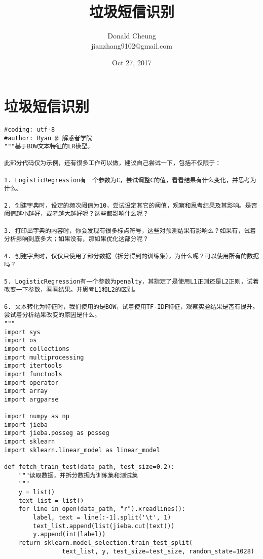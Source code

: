 \documentclass[10pt,a4paper]{ctexbook}
\begin{document}
    \setlength{\baselineskip}{20pt}
    \title{垃圾短信识别}
    \author{Donald Cheung\\jianzhang9102@gmail.com}
    \date{Oct 27, 2017}
    \tableofcontents
\fi

\chapter{垃圾短信识别}

\begin{verbatim}
#coding: utf-8
#author: Ryan @ 解惑者学院
"""基于BOW文本特征的LR模型。

此部分代码仅为示例，还有很多工作可以做，建议自己尝试一下，包括不仅限于：

1. LogisticRegression有一个参数为C，尝试调整C的值，看看结果有什么变化，并思考为什么。

2. 创建字典时，设定的频次阈值为10，尝试设定其它的阈值，观察和思考结果及其影响。是否阈值越小越好，或者越大越好呢？这些都影响什么呢？

3. 打印出字典的内容时，你会发现有很多标点符号，这些对预测结果有影响么？如果有，试着分析影响到底多大；如果没有，那如果优化这部分呢？

4. 创建字典时，仅仅只使用了部分数据（拆分得到的训练集），为什么呢？可以使用所有的数据吗？

5. LogisticRegression有一个参数为penalty，其指定了是使用L1正则还是L2正则，试着改变一下参数，看看结果。并思考L1和L2的区别。

6. 文本转化为特征时，我们使用的是BOW，试着使用TF-IDF特征，观察实验结果是否有提升。尝试着分析结果改变的原因是什么。
"""
import sys
import os
import collections
import multiprocessing
import itertools
import functools
import operator
import array
import argparse

import numpy as np
import jieba
import jieba.posseg as posseg
import sklearn
import sklearn.linear_model as linear_model

def fetch_train_test(data_path, test_size=0.2):
    """读取数据，并拆分数据为训练集和测试集
    """
    y = list()
    text_list = list()
    for line in open(data_path, "r").xreadlines():
        label, text = line[:-1].split('\t', 1)
        text_list.append(list(jieba.cut(text)))
        y.append(int(label))
    return sklearn.model_selection.train_test_split(
                text_list, y, test_size=test_size, random_state=1028)



\end{verbatim}
\end{document}
